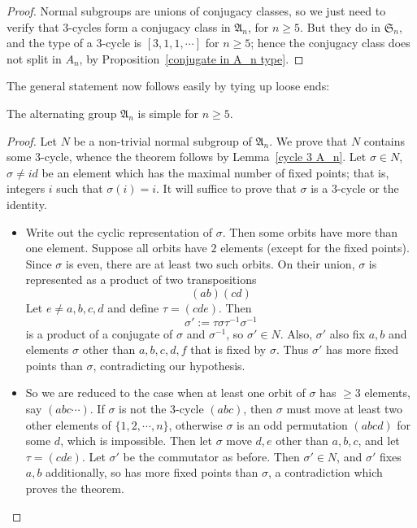 \begin{proof}
Normal subgroups are unions of conjugacy classes, so we just need to verify
that $3$-cycles form a conjugacy class in $\mathfrak{A}_n$, for $n\geq 5$. But they do in $\mathfrak{S}_n$, and the type of a $3$-cycle is $[3,1,1,\cdots]$ for $n\geq 5$; hence the conjugacy class does not split in $A_n$, by Proposition~\ref{conjugate in A_n type}.
\end{proof}
The general statement now follows easily by tying up loose ends:
\begin{theorem}
The alternating group $\mathfrak{A}_n$ is simple for $n\geq 5$.
\end{theorem}
\begin{proof}
Let $N$ be a non-trivial normal subgroup of $\mathfrak{A}_n$. We prove that $N$ contains some $3$-cycle, whence the theorem follows by Lemma~\ref{cycle 3 A_n}. Let $\sigma\in N$, $\sigma\neq id$ be an element which has the maximal number of fixed points; that is, integers $i$ such that $\sigma(i)=i$. It will suffice to prove that $\sigma$ is a $3$-cycle or the identity.
\begin{itemize}
\item Write out the cyclic representation of $\sigma$. Then some orbits have more than one element. Suppose all orbits have $2$ elements (except for the fixed points). Since $\sigma$ is even, there are at least two such orbits. On their union, $\sigma$ is represented as a product of two transpositions
\[(ab)(cd)\]
Let $e\neq a,b,c,d$ and define $\tau=(cde)$. Then
\[\sigma':=\tau\sigma\tau^{-1}\sigma^{-1}\]
is a product of a conjugate of $\sigma$ and $\sigma^{-1}$, so $\sigma'\in N$. Also, $\sigma'$ also fix $a,b$ and elements $\sigma$ other than $a,b,c,d,f$ that is fixed by $\sigma$. Thus $\sigma'$ has more fixed points than $\sigma$, contradicting our hypothesis.
\item So we are reduced to the case when at least one orbit of $\sigma$ has $\geq3$ elements, say $(abc\cdots)$. If $\sigma$ is not the $3$-cycle $(abc)$, then $\sigma$ must move at least two other elements of $\{1,2,\cdots,n\}$, otherwise $\sigma$ is an odd permutation $(abcd)$ for some $d$, which is impossible. Then let $\sigma$ move $d,e$ other than $a,b,c$, and let $\tau=(cde)$. Let $\sigma'$ be the commutator as before. Then $\sigma'\in N$, and $\sigma'$ fixes $a,b$ additionally, so has more fixed points than $\sigma$, a contradiction which proves the theorem.
\end{itemize}
\end{proof}
